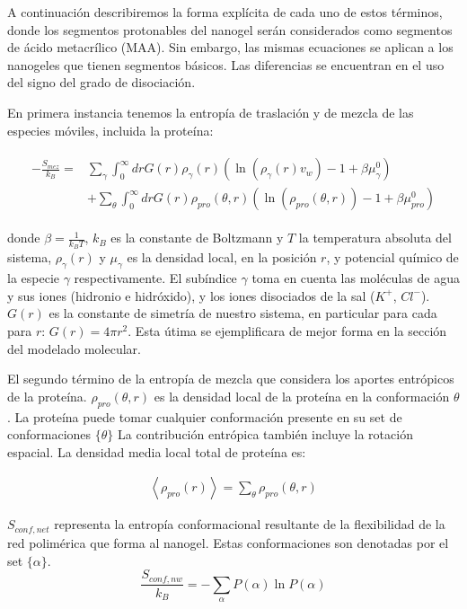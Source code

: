 A continuaci\'on describiremos la forma expl\'icita de cada uno de estos t\'erminos, donde los segmentos protonables del nanogel ser\'an considerados como segmentos de \'acido metacrílico (MAA). Sin embargo, las mismas ecuaciones se aplican a los nanogeles que tienen segmentos b\'asicos. Las diferencias se encuentran en el uso del signo del grado de disociaci\'on.

En primera instancia tenemos la entrop\'ia de traslaci\'on y de mezcla de las especies m\'oviles, incluida la prote\'ina:


\begin{align}
	\begin{aligned}
		-\frac{S_{mez}}{k_B}= &\sum_{\gamma}\int_0^\infty{dr G(r)\rho_\gamma(r)\left(\ln \left(\rho_\gamma (r)v_w\right) -1 + \beta\mu^0_\gamma\right)} \\
		&+ \sum_{\theta}\int_0^\infty{dr G(r)\rho_{pro}(\theta,r)\left(\ln \left(\rho_{pro}(\theta,r)\right) -1 + \beta\mu^0_{pro} \right)}
	\end{aligned}
\end{align}



\noindent donde $\beta = \frac{1}{k_BT}$, $k_B$ es la constante de Boltzmann y $T$ la temperatura absoluta del sistema, $\rho_\gamma(r)$ y $\mu_\gamma$ es la densidad local, en la posici\'on $r$, y potencial qu\'imico de la especie $\gamma$ respectivamente.
El sub\'indice $\gamma$ toma en cuenta las mol\'eculas de agua y sus iones (hidronio e hidr\'oxido), y los iones disociados de la sal ($K^+$, $Cl^-$). $G(r)$ es la constante de simetr\'ia de nuestro sistema, en particular para cada para $r$: $G(r) =4\pi r^2$. Esta \'utima se ejemplificara de mejor forma en la secci\'on del modelado molecular.

El segundo t\'ermino de la entrop\'ia de mezcla que considera los aportes entr\'opicos de la prote\'ina.
$\rho_{pro}(\theta,r)$ es la densidad local de la prote\'ina en la conformaci\'on  $\theta$.  La prote\'ina puede tomar cualquier conformaci\'on presente en su set de conformaciones $\{\theta \}$
La contribuci\'on entr\'opica tambi\'en incluye la rotación espacial.
La densidad media local total de prote\'ina es: 


\begin{align}
	\left<\rho_{pro}(r)\right> = \sum_\theta{\rho_{pro}(\theta,r)}
\end{align}




$S_{conf,net}$ representa la entrop\'ia conformacional resultante de la flexibilidad de la red polim\'erica que forma al nanogel. Estas conformaciones son  denotadas por el set $\{\alpha\}$. 
\begin{equation}
	\frac{S_{conf,nw}}{k_B} = - \sum_{\alpha}{P(\alpha)\ln P(\alpha)}
\end{equation}



